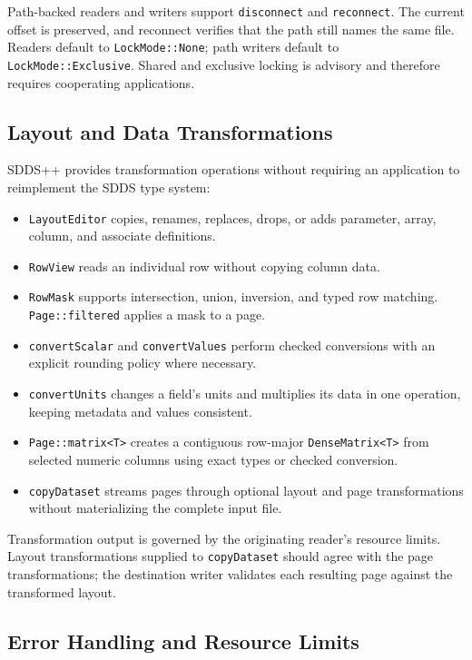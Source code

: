 \documentclass[11pt]{article}
\begin{document}
Path-backed readers and writers support {\tt disconnect} and {\tt reconnect}.
The current offset is preserved, and reconnect verifies that the path still
names the same file.  Readers default to {\tt LockMode::None}; path writers
default to {\tt LockMode::Exclusive}.  Shared and exclusive locking is
advisory and therefore requires cooperating applications.

\subsection{Layout and Data Transformations}

SDDS++ provides transformation operations without requiring an application to
reimplement the SDDS type system:

\begin{itemize}
\item {\tt LayoutEditor} copies, renames, replaces, drops, or adds parameter,
array, column, and associate definitions.
\item {\tt RowView} reads an individual row without copying column data.
\item {\tt RowMask} supports intersection, union, inversion, and typed row
matching.  {\tt Page::filtered} applies a mask to a page.
\item {\tt convertScalar} and {\tt convertValues} perform checked conversions
with an explicit rounding policy where necessary.
\item {\tt convertUnits} changes a field's units and multiplies its data in one
operation, keeping metadata and values consistent.
\item {\tt Page::matrix<T>} creates a contiguous row-major
{\tt DenseMatrix<T>} from selected numeric columns using exact types or checked
conversion.
\item {\tt copyDataset} streams pages through optional layout and page
transformations without materializing the complete input file.
\end{itemize}

Transformation output is governed by the originating reader's resource limits.
Layout transformations supplied to {\tt copyDataset} should agree with the page
transformations; the destination writer validates each resulting page against
the transformed layout.

\subsection{Error Handling and Resource Limits}
\end{document}
